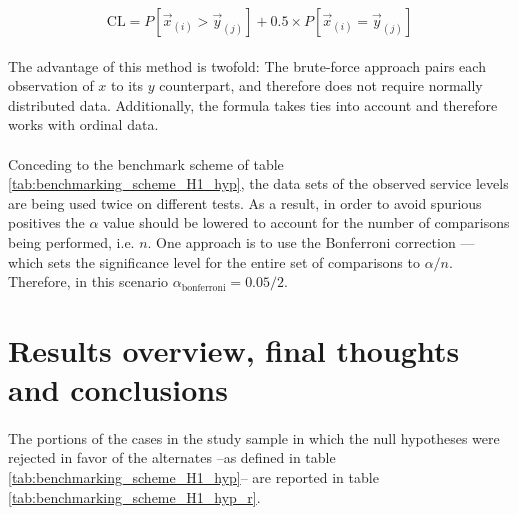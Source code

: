 \documentclass[letterpaper]{article}
\begin{document}
\begin{equation}
    \mathrm{CL} = P\left[\vec{x}_{(i)}>\vec{y}_{(j)}\right] + 0.5\times{P\left[\vec{x}_{(i)}=\vec{y}_{(j)}\right]}
\end{equation}

\paragraph{}
The advantage of this method is twofold: The brute-force approach pairs each observation of $x$ to its $y$ counterpart, and therefore does not require normally distributed data. Additionally, the formula takes ties into account and therefore works with ordinal data.

\paragraph{}
Conceding to the benchmark scheme of table \ref{tab:benchmarking_scheme_H1_hyp}, the data sets of the observed service levels are being used twice on different tests. As a result, in order to avoid spurious positives the $\alpha$ value should be lowered to account for the number of comparisons being performed, i.e. $n$. One approach is to use the Bonferroni correction --\cite{weisstein2004bonferroni}-- which sets the significance level for the entire set of comparisons to $\alpha/n$. Therefore, in this scenario $\alpha_\mathrm{bonferroni}=0.05/2$.


\section*{Results overview, final thoughts and conclusions}

\paragraph{}
The portions of the cases in the study sample in which the null hypotheses were rejected in favor of the alternates --as defined in table \ref{tab:benchmarking_scheme_H1_hyp}-- are reported in table \ref{tab:benchmarking_scheme_H1_hyp_r}.
\end{document}
